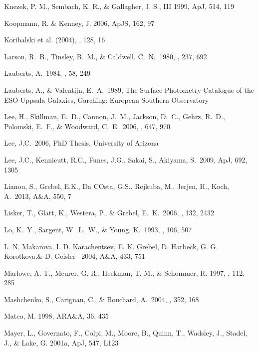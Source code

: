 \documentclass[12pt,preprint]{aastex}
\begin{document}
\begin{thebibliography}{}
Knezek, P. M., Sembach, K. R., \& Gallagher, J. S., III 1999, ApJ, 514, 119

Koopmann, R. \& Kenney, J. 2006, ApJS, 162, 97

Koribalski et al. (2004),  \aj, 128, 16

Larson, R.~B., Tinsley, B.~M., \& Caldwell, C.~N.\ 1980, \apj, 237, 692 

Lauberts, A.\ 1984, \aaps, 58, 249 

Lauberts, A., \& Valentijn, E.~A.\ 1989,
The Surface Photometry Catalogue of the ESO‐Uppsala Galaxies,
Garching: European Southern Observatory  

Lee, H., Skillman, E.~D., Cannon, J.~M., Jackson, D.~C., Gehrz, R.~D., 
Polomski, E.~F., \& Woodward, C.~E.\ 2006, \apj, 647, 970 

Lee, J.C.\ 2006, PhD Thesis, University of Arizona

Lee, J.C., Kennicutt, R.C., Funes, J.G., Sakai, S., Akiyama, S.\ 2009, ApJ, 692, 1305

Lianou, S., Grebel, E.K., Da COsta, G.S., Rejkuba, M., Jerjen, H., Koch, A.\ 2013, A\&A, 550, 7

Lisker, T., Glatt, K., Westera, P., \& Grebel, E.~K.\ 2006, \aj, 132, 2432

Lo, K.~Y., Sargent, W.~L.~W., \& Young, K.\ 1993, \aj, 106, 507 

L. N. Makarova, I. D. Karachentsev, E. K. Grebel, D. Harbeck, G. G. Korotkova,\&
D. Geisler \ 2004, A\&A, 433, 751

Marlowe, A. T., Meurer, G. R., Heckman, T. M., \& Schommer, R. 1997, 
\apjs , 112, 285

Mashchenko, S., Carignan, C., \& Bouchard, A.\ 2004, \mnras, 352, 168 

Mateo, M. 1998, ARA\&A, 36, 435

Mayer, L., Governato, F., Colpi, M., Moore, B., Quinn, T., Wadsley, J., 
Stadel, J., \& Lake, G. 2001a, ApJ, 547, L123


\end{thebibliography}
\end{document}
